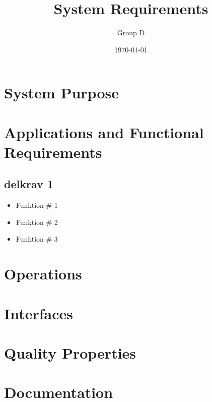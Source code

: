 \documentclass[a4paper]{article}
\title{System Requirements}
\author{Group D}
\date{\today}
\begin{document}
	\maketitle
	\thispagestyle{empty}
	\setcounter{page}{0}
	\pagebreak
	\tableofcontents
	\pagebreak
	

	\section{System Purpose} %
	\section{Applications and Functional Requirements}
	\subsection{delkrav 1}
	\begin{itemize}
			\item Funktion \# 1
			\item Funktion \# 2
			\item Funktion \# 3
		\end{itemize}
	\section{Operations}
	\section{Interfaces}
	\section{Quality Properties}
	\section{Documentation}
	
\end{document}
